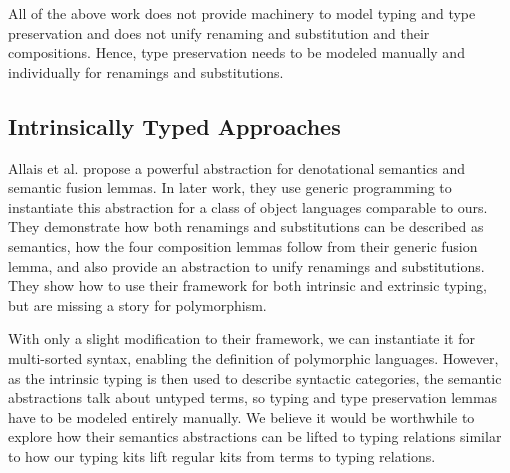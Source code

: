 \documentclass[a4paper, UKenglish, cleveref, autoref, thm-restate]{lipics-v2021}
\begin{document}
  All of the above work does not provide machinery to model typing
  and type preservation and does not unify renaming and substitution and
  their compositions.
  Hence, type preservation needs to be modeled manually and
  individually for renamings and substitutions.



  \subsection{Intrinsically Typed Approaches}

  Allais et al.\cite{DBLP:conf/cpp/Allais0MM17} propose a powerful
  abstraction for denotational semantics and semantic fusion lemmas.
  In later work\cite{DBLP:journals/pacmpl/AllaisA0MM18}, they use
  generic programming to instantiate this abstraction for a class of
  object languages comparable to ours.
  They demonstrate how both renamings and substitutions can be
  described as semantics, how the four composition lemmas follow from
  their generic fusion lemma, and also provide an abstraction to unify
  renamings and substitutions.
  They show how to use their framework for both intrinsic and
  extrinsic typing, but are missing a story for polymorphism.

  With only a slight modification to their framework, we can instantiate it
  for multi-sorted syntax, enabling the definition of polymorphic languages.
  However, as the intrinsic typing is then
  used to describe syntactic categories, the semantic abstractions talk about untyped
  terms, so typing and type preservation lemmas have to be modeled entirely manually.
  We believe it would be worthwhile to explore how their semantics
  abstractions can be lifted to typing relations similar to how our typing kits lift
  regular kits from terms to typing relations.

\end{document}
